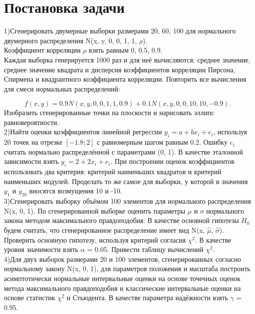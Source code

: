 \documentclass[a4]{article}
\begin{document}
	
	\newpage
	\tableofcontents{}
	\newpage
	\listoffigures
	\newpage
	\listoftables
	\newpage
	
	
	\section{Постановка задачи}
		1)Сгенерировать двумерные выборки размерами 20, 60, 100 для нормального двумерного распределения N(x, y, 0, 0, 1, 1, $\rho$).\\
		Коэффициент корреляции $\rho$ взять равным 0, 0.5, 0.9.\\
		Каждая выборка генерируется 1000 раз и для неё вычисляются: среднее значение, среднее значение квадрата и дисперсия коэффициентов корреляции Пирсона, Спирмена и квадрантного коэффициента корреляции.
		Повторить все вычисления для смеси нормальных распределений:

		$$f(x, y) = 0.9N(x, y, 0, 0, 1, 1, 0.9) + 0.1N(x, y, 0, 0, 10, 10, -0.9).$$
		Изобразить сгенерированные точки на плоскости и нарисовать эллипс равновероятности.\\
	
		2)Найти оценки коэффициентов линейной регрессии $y_i = a + bx_i + e_i$, используя 20 точек на отрезке $[-1.8; 2]$ с равномерным шагом равным 0.2. Ошибку $e_i$ считать нормально распределённой с параметрами (0, 1). В качестве эталонной зависимости взять $y_i = 2 + 2x_i + e_i$. При построении оценок коэффициентов использовать два критерия: критерий наименьших квадратов и критерий наименьших модулей. Проделать то же самое для выборки, у которой в значения $y_1$ и $y_20$ вносятся возмущения 10 и -10.\\
		
		3)Сгенерировать выборку объёмом 100 элементов для нормального распределения N(x, 0, 1). По сгенерированной выборке оценить параметры $\mu$ и $\sigma$ нормального закона методом максимального правдоподобия. В качестве основной гипотезы $H_0$ будем считать, что сгенерированное распределение имеет вид N(x, $\hat{\mu}$, $\hat{\sigma}$). Проверить основную гипотезу, используя критерий согласия $\chi^2$. В качестве уровня значимости взять $\alpha$ = 0.05. Привести таблицу вычислений $\chi^2$.\\
		
		4)Для двух выборок размерами 20 и 100 элементов, сгенерированных согласно нормальному закону N(x, 0, 1), для параметров положения и масштаба построить асимптотически нормальные интервальные оценки на основе точечных оценок метода максимального правдоподобия и классические интервальные оценки на основе статистик $\chi^2$ и Стьюдента. В качестве параметра надёжности взять $\gamma$ = 0.95.
\end{document}
